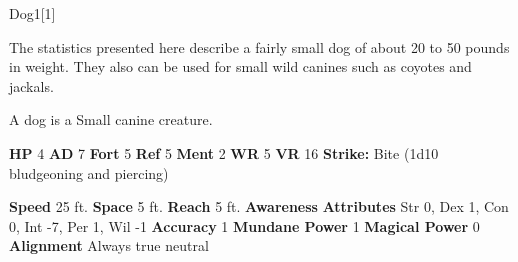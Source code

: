   
  \begin{monsection}{Dog}{1}[1]
    \vspace{-1em}\vspace{-1em}
    \vspace{0em}

    
     The statistics presented here describe a fairly small dog of about 20 to 50 pounds in weight.
     They also can be used for small wild canines such as coyotes and jackals.
    
        A dog is a Small canine creature.
      

    \begin{spellcontent}
      \begin{spelltargetinginfo}
        \pari \textbf{HP} 4 \monsep
          \textbf{AD} 7 \monsep
          \textbf{Fort} 5 \monsep
          \textbf{Ref} 5 \monsep
          \textbf{Ment} 2
        \pari \textbf{WR} 5 \monsep
        \textbf{VR} 16
        \pari \textbf{Strike:}
            Bite  (1d10 bludgeoning and piercing)
      \end{spelltargetinginfo}
    \end{spellcontent}
    \begin{monsterfooter}
      \pari \textbf{Speed} 25 ft. \monsep
        \textbf{Space} 5 ft. \monsep
        \textbf{Reach} 5 ft.
      \pari \textbf{Awareness} 
      \pari \textbf{Attributes}
        Str 0, Dex 1,
        Con 0, Int -7,
        Per 1, Wil -1
      \pari \textbf{Accuracy} 1 \monsep
        \textbf{Mundane Power} 1 \monsep
      \textbf{Magical Power} 0
      \pari \textbf{Alignment} Always true neutral
    \end{monsterfooter}
  \end{monsection}
  
